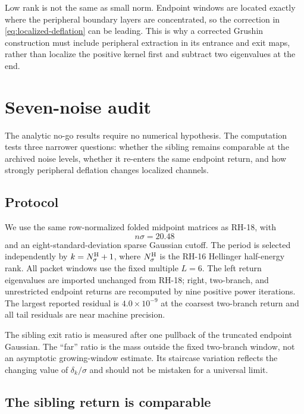 \documentclass[11pt]{article}
\theoremstyle{definition}
\theoremstyle{remark}
\begin{document}
Low rank is not the same as small norm.  Endpoint windows are located exactly
where the peripheral boundary layers are concentrated, so the correction in
\eqref{eq:localized-deflation} can be leading.  This is why a corrected
Grushin construction must include peripheral extraction in its entrance and
exit maps, rather than localize the positive kernel first and subtract two
eigenvalues at the end.

\section{Seven-noise audit}
\label{sec:numerics}

The analytic no-go results require no numerical hypothesis.  The computation
tests three narrower questions: whether the sibling remains comparable at
the archived noise levels, whether it re-enters the same endpoint return,
and how strongly peripheral deflation changes localized channels.

\subsection{Protocol}

We use the same row-normalized folded midpoint matrices as RH-18, with
\begin{equation}\label{eq:dimension-law}
 n\sigma=20.48
\end{equation}
and an eight-standard-deviation sparse Gaussian cutoff.  The period is
selected independently by $k=N_\sigma^{\rm H}+1$, where
$N_\sigma^{\rm H}$ is the RH-16 Hellinger half-energy rank.  All packet
windows use the fixed multiple $L=6$.  The left return eigenvalues are
imported unchanged from RH-18; right, two-branch, and unrestricted endpoint
returns are recomputed by nine positive power iterations.  The largest
reported residual is $4.0\times10^{-9}$ at the coarsest two-branch return and
all tail residuals are near machine precision.

The sibling exit ratio is measured after one pullback of the truncated
endpoint Gaussian.  The ``far'' ratio is the mass outside the fixed
two-branch window, not an asymptotic growing-window estimate.  Its staircase
variation reflects the changing value of $\delta_k/\sigma$ and should not be
mistaken for a universal limit.

\subsection{The sibling return is comparable}
\end{document}
